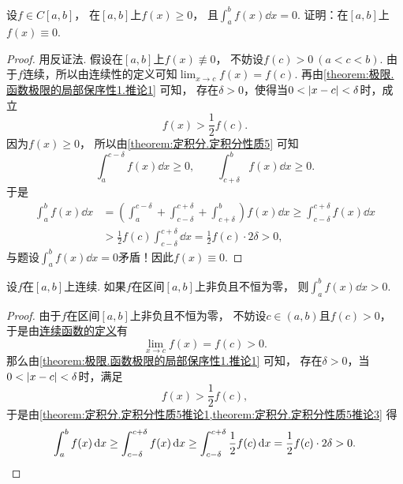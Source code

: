\begin{example}
设\(f \in C[a,b]\)，
在\([a,b]\)上\(f(x)\geq0\)，
且\(\int_a^b f(x) \dd{x} = 0\).
证明：在\([a,b]\)上\(f(x)\equiv0\).
\begin{proof}
用反证法.
假设在\([a,b]\)上\(f(x)\not\equiv0\)，
不妨设\(f(c)>0\ (a<c<b)\).
由于\(f\)连续，所以由连续性的定义可知\(\lim_{x \to c} f(x) = f(c)\).
再由\cref{theorem:极限.函数极限的局部保序性1.推论1} 可知，
存在\(\delta>0\)，使得当\(0<\abs{x-c}<\delta\)时，成立\begin{equation*}
	f(x) > \frac12 f(c).
\end{equation*}
因为\(f(x)\geq0\)，
所以由\cref{theorem:定积分.定积分性质5} 可知\begin{equation*}
	\int_a^{c-\delta} f(x) \dd{x} \geq 0,
	\qquad
	\int_{c+\delta}^b f(x) \dd{x} \geq 0.
\end{equation*}
于是\begin{align*}
	\int_a^b f(x) \dd{x}
	&= \left( \int_a^{c-\delta} + \int_{c-\delta}^{c+\delta} + \int_{c+\delta}^b \right) f(x) \dd{x}
	\geq \int_{c-\delta}^{c+\delta} f(x) \dd{x} \\
	&> \frac12 f(c) \int_{c-\delta}^{c+\delta} \dd{x}
	= \frac12 f(c) \cdot 2\delta
	> 0,
\end{align*}
与题设\(\int_a^b f(x) \dd{x} = 0\)矛盾！因此\(f(x)\equiv0\).
\end{proof}
\end{example}
\begin{example}
设\(f\)在\([a,b]\)上连续.
如果\(f\)在区间\([a,b]\)上非负且不恒为零，
则\(\int_a^b f(x) \dd{x} > 0\).
\begin{proof}
由于\(f\)在区间\([a,b]\)上非负且不恒为零，
不妨设\(c \in (a,b)\)且\(f(c)>0\)，
于是由\hyperref[definition:极限.函数在一点的连续性]{连续函数的定义}有\begin{equation*}
	\lim_{x \to c} f(x) = f(c) > 0.
\end{equation*}
那么由\cref{theorem:极限.函数极限的局部保序性1.推论1} 可知，
存在\(\delta>0\)，当\(0 < \abs{x-c} < \delta\)时，满足\begin{equation*}
	f(x) > \frac12 f(c),
\end{equation*}
于是由\cref{theorem:定积分.定积分性质5推论1,theorem:定积分.定积分性质5推论3} 得\begin{equation*}
	\int_a^b f(x) \dd{x}
	\geq \int_{c-\delta}^{c+\delta} f(x) \dd{x}
	\geq \int_{c-\delta}^{c+\delta} \frac12 f(c) \dd{x}
	= \frac12 f(c) \cdot 2 \delta
	> 0.
	\qedhere
\end{equation*}
\end{proof}
\end{example}

